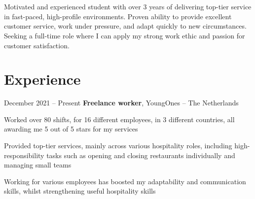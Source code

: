 



	\newcommand{\AND}{\unskip
		\cleaders\copy\ANDbox\hskip\wd\ANDbox
		\ignorespaces
	}
	\newsavebox\ANDbox
	\sbox\ANDbox{$|$}
	
	
	
	\vspace{-0.6cm}
	
	\section{}
	

	\begin{onecolentry}
		Motivated and experienced student with over 3 years of delivering top-tier service in fast-paced, high-profile environments. Proven ability to provide excellent customer service, work under pressure, and adapt quickly to new circumstances. Seeking a full-time role where I can apply my strong work ethic and passion for customer satisfaction.
	\end{onecolentry}
	
	\section{Experience}
	
	\begin{twocolentry}{
			December 2021 – Present
		}
		\textbf{Freelance worker}, YoungOnes -- The Netherlands
	\end{twocolentry}
	
	\vspace{0.10 cm}
	\begin{onecolentry}
		\begin{highlights}
			\item Worked over 80 shifts, for 16 different employees, in 3 different countries, all awarding me 5 out of 5 stars for my services
			\item Provided top-tier services, mainly across various hospitality roles, including high-responsibility tasks such as opening and closing restaurants individually and managing small teams
			\item Working for various employees has boosted my adaptability and communication skills, whilst strengthening useful hospitality skills
		\end{highlights}
	\end{onecolentry}
	
	\vspace{0.2 cm}
	
